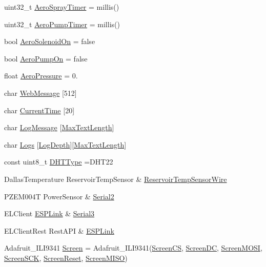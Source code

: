 \begin{DoxyCompactItemize}
\item 
uint32\+\_\+t \mbox{\hyperlink{_gbox420_8ino_a783bc1f796427226842622a42e449df3}{Aero\+Spray\+Timer}} = millis()
\item 
uint32\+\_\+t \mbox{\hyperlink{_gbox420_8ino_a81a39ae68f690eaa113bcf2d29400d7c}{Aero\+Pump\+Timer}} = millis()
\item 
bool \mbox{\hyperlink{_gbox420_8ino_a330d992d7822c40948b498b55f871e98}{Aero\+Solenoid\+On}} = false
\item 
bool \mbox{\hyperlink{_gbox420_8ino_ac7c022a192495f224431ed17e7f36ff0}{Aero\+Pump\+On}} = false
\item 
float \mbox{\hyperlink{_gbox420_8ino_af72129a3c71d6d71ed37b3d4e3ab75e6}{Aero\+Pressure}} = 0.
\item 
char \mbox{\hyperlink{_gbox420_8ino_a55de604f183fd5f0fceb767aabe9efce}{Web\+Message}} \mbox{[}512\mbox{]}
\item 
char \mbox{\hyperlink{_gbox420_8ino_a33d7ab33fd7541847af3bcaa6abbc7f2}{Current\+Time}} \mbox{[}20\mbox{]}
\item 
char \mbox{\hyperlink{_gbox420_8ino_aaec8722cf3c8a9f79cc8f7eef3e777e2}{Log\+Message}} \mbox{[}\mbox{\hyperlink{420_settings_8h_a1b8e1e4d41c8b790a064405b0c219a6c}{Max\+Text\+Length}}\mbox{]}
\item 
char \mbox{\hyperlink{_gbox420_8ino_a5ff6182d5779c7a6035f51cf6f3504f2}{Logs}} \mbox{[}\mbox{\hyperlink{420_settings_8h_ab2ccf5621e9f5893516bcc5657df9b84}{Log\+Depth}}\mbox{]}\mbox{[}\mbox{\hyperlink{420_settings_8h_a1b8e1e4d41c8b790a064405b0c219a6c}{Max\+Text\+Length}}\mbox{]}
\item 
const uint8\+\_\+t \mbox{\hyperlink{_gbox420_8ino_adc7a68db9f5a31bc91546195883a2bbc}{D\+H\+T\+Type}} =D\+H\+T22
\item 
Dallas\+Temperature Reservoir\+Temp\+Sensor \& \mbox{\hyperlink{_gbox420_8ino_a527b6bdce19681ccfe316960da5a32ca}{Reservoir\+Temp\+Sensor\+Wire}}
\item 
P\+Z\+E\+M004T Power\+Sensor \& \mbox{\hyperlink{_gbox420_8ino_a087076c54fe131098d9aa5703ccefac7}{Serial2}}
\item 
E\+L\+Client \mbox{\hyperlink{_gbox420_8ino_ab3b574c627e04e5023952f501e269a06}{E\+S\+P\+Link}} \& \mbox{\hyperlink{_gbox420_8ino_ae6cf0a4b7926494122c35468c7f1ac7e}{Serial3}}
\item 
E\+L\+Client\+Rest Rest\+A\+PI \& \mbox{\hyperlink{_gbox420_8ino_ab3b574c627e04e5023952f501e269a06}{E\+S\+P\+Link}}
\item 
Adafruit\+\_\+\+I\+L\+I9341 \mbox{\hyperlink{_gbox420_8ino_aa942dbfbc8706161b88870d67954906e}{Screen}} = Adafruit\+\_\+\+I\+L\+I9341(\mbox{\hyperlink{420_pins_8h_a65916b6065e3b5d98448b979123158c9}{Screen\+CS}}, \mbox{\hyperlink{420_pins_8h_ab09e1b852e54f2f0747abfae1f63aa2b}{Screen\+DC}}, \mbox{\hyperlink{420_pins_8h_ab90bca7e74b9865786115e4d36957345}{Screen\+M\+O\+SI}}, \mbox{\hyperlink{420_pins_8h_a1ed58e1cf5ac44ce8b14a16ca301f4c3}{Screen\+S\+CK}}, \mbox{\hyperlink{420_pins_8h_a4e4d5f7435dbe76a52b878cf1e5460e6}{Screen\+Reset}}, \mbox{\hyperlink{420_pins_8h_abe77e19b4b421b1951404c107bf971c0}{Screen\+M\+I\+SO}})

\end{DoxyCompactItemize}
